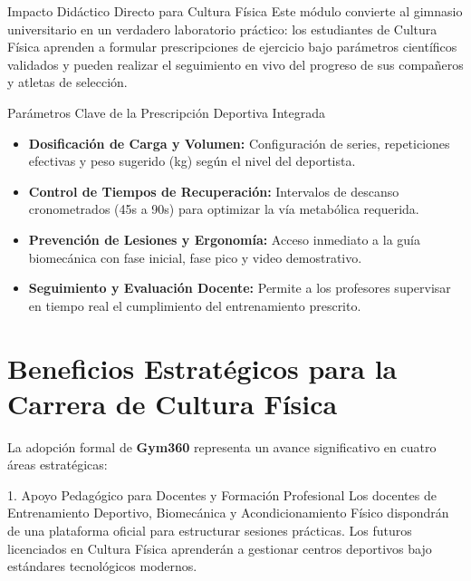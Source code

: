\documentclass[11pt,a4paper]{article}
\begin{document}
\vspace{2.5mm}

\begin{calloutbox}{Impacto Didáctico Directo para Cultura Física}
Este módulo convierte al gimnasio universitario en un verdadero laboratorio práctico: los estudiantes de Cultura Física aprenden a formular prescripciones de ejercicio bajo parámetros científicos validados y pueden realizar el seguimiento en vivo del progreso de sus compañeros y atletas de selección.
\end{calloutbox}

\vspace{1.5mm}

\begin{calloutbox}{Parámetros Clave de la Prescripción Deportiva Integrada}
\begin{itemize}
    \item \textbf{Dosificación de Carga y Volumen:} Configuración de series, repeticiones efectivas y peso sugerido (kg) según el nivel del deportista.
    \item \textbf{Control de Tiempos de Recuperación:} Intervalos de descanso cronometrados (45s a 90s) para optimizar la vía metabólica requerida.
    \item \textbf{Prevención de Lesiones y Ergonomía:} Acceso inmediato a la guía biomecánica con fase inicial, fase pico y video demostrativo.
    \item \textbf{Seguimiento y Evaluación Docente:} Permite a los profesores supervisar en tiempo real el cumplimiento del entrenamiento prescrito.
\end{itemize}
\end{calloutbox}

\newpage

\section{Beneficios Estratégicos para la Carrera de Cultura Física}

La adopción formal de \textbf{Gym360} representa un avance significativo en cuatro áreas estratégicas:

\begin{calloutbox}{1. Apoyo Pedagógico para Docentes y Formación Profesional}
Los docentes de Entrenamiento Deportivo, Biomecánica y Acondicionamiento Físico dispondrán de una plataforma oficial para estructurar sesiones prácticas. Los futuros licenciados en Cultura Física aprenderán a gestionar centros deportivos bajo estándares tecnológicos modernos.
\end{calloutbox}
\end{document}
